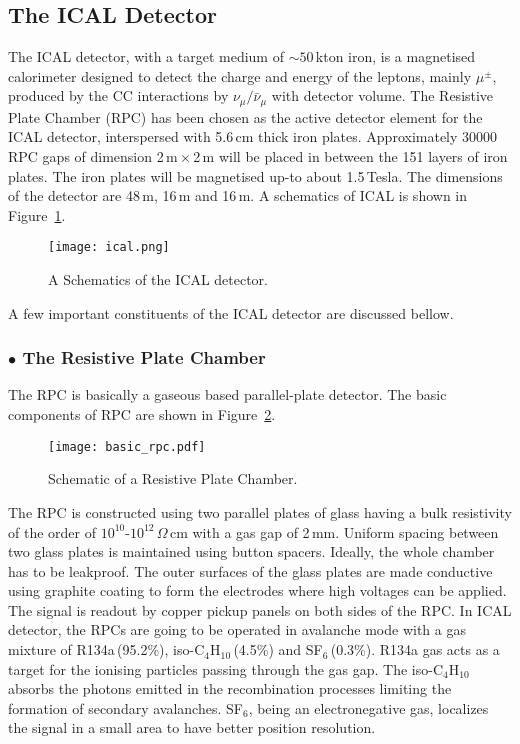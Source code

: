 \subsection{The ICAL Detector}
The ICAL detector, with a target medium of $\sim 50$\,kton iron, is a magnetised calorimeter designed to detect the charge and energy of the leptons, mainly $\mu^{\pm}$, produced by the CC interactions by $\nu_{\mu}/\bar{\nu}_{\mu}$ with detector volume. The Resistive Plate Chamber (RPC) has been chosen as the active detector element for the ICAL detector, interspersed with 5.6\,cm thick iron plates. Approximately 30000 RPC gaps of dimension 2\,m\,$\times$\,2\,m will be placed in between the 151 layers of iron plates. The iron plates will be magnetised up-to about 1.5\,Tesla. The dimensions of the detector are 48\,m, 16\,m and 16\,m. A schematics of ICAL is shown in Figure~\ref{fig:icalsk}. 
\begin{figure}[h]
  \centering
  \texttt{[image: ical.png]}
  \caption{A Schematics of the ICAL detector\cite{inoreport}.}
  \label{fig:icalsk}
\end{figure}
A few important constituents of the ICAL detector are discussed bellow.

\subsubsection*{$\bullet$ The Resistive Plate Chamber}
The RPC is basically a gaseous based parallel-plate detector\cite{rpc_p2}. The basic components of RPC are shown in Figure~\ref{fig:rpc}. 
\begin{figure}[h]
  \centering
  \texttt{[image: basic\_rpc.pdf]}
  \caption{Schematic of a Resistive Plate Chamber.}
  \label{fig:rpc}
\end{figure}
The RPC is constructed using two parallel plates of glass having a bulk resistivity of the order of $10^{10}$-$10^{12}$\,$\Omega$\,cm with a gas gap of 2\,mm. Uniform spacing between two glass plates is maintained using button spacers. Ideally, the whole chamber has to be leakproof. The outer surfaces of the glass plates are made conductive using graphite coating to form the electrodes where high voltages can be applied. The signal is readout by copper pickup panels on both sides of the RPC. In ICAL detector, the RPCs are going to be operated in avalanche mode with a gas mixture of R134a\,(95.2\%), iso-C$_4$H$_{10}$\,(4.5\%) and SF$_6$\,(0.3\%). R134a gas acts as a target for the ionising particles passing through the gas gap. The iso-C$_4$H$_{10}$ absorbs the photons emitted in the recombination processes limiting the formation of secondary avalanches. SF$_6$, being an electronegative gas, localizes the signal in a small area to have better position resolution.


